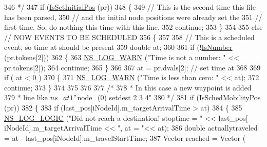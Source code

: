 \begin{DoxyCode}
346 \textcolor{comment}{           */}
347           \textcolor{keywordflow}{if} (\hyperlink{namespacens3_a9857c35eef6abfd7464f64108e1bfd29}{IsSetInitialPos} (pr))
348             \{
349               \textcolor{comment}{// This is the second time this file has been parsed,}
350               \textcolor{comment}{// and the initial node positions were already set the}
351               \textcolor{comment}{// first time.  So, do nothing this time with this line.}
352               \textcolor{keywordflow}{continue};
353             \}
354 
355           \textcolor{keywordflow}{else} \textcolor{comment}{// NOW EVENTS TO BE SCHEDULED}
356             \{
357 
358               \textcolor{comment}{// This is a scheduled event, so time at should be present}
359               \textcolor{keywordtype}{double} at;
360 
361               \textcolor{keywordflow}{if} (!\hyperlink{namespacens3_a1e7c472bb9c018ecd3509390ca7d09b3}{IsNumber} (pr.tokens[2]))
362                 \{
363                   \hyperlink{group__logging_gade7208b4009cdf0e25783cd26766f559}{NS\_LOG\_WARN} (\textcolor{stringliteral}{"Time is not a number: "} << pr.tokens[2]);
364                   \textcolor{keywordflow}{continue};
365                 \}
366 
367               at = pr.dvals[2]; \textcolor{comment}{// set time at}
368 
369               \textcolor{keywordflow}{if} ( at < 0 )
370                 \{
371                   \hyperlink{group__logging_gade7208b4009cdf0e25783cd26766f559}{NS\_LOG\_WARN} (\textcolor{stringliteral}{"Time is less than cero: "} << at);
372                   \textcolor{keywordflow}{continue};
373                 \}
374 
375 
376 
377               \textcolor{comment}{/*}
378 \textcolor{comment}{               * In this case a new waypoint is added}
379 \textcolor{comment}{               * line like $ns\_ at 1 "$node\_(0) setdest 2 3 4"}
380 \textcolor{comment}{               */}
381               \textcolor{keywordflow}{if} (\hyperlink{namespacens3_a1ccf8bc01e3dea4e713a6bddb9ef6e0e}{IsSchedMobilityPos} (pr))
382                 \{
383                   \textcolor{keywordflow}{if} (last\_pos[iNodeId].m\_targetArrivalTime > at)
384                     \{
385                       \hyperlink{group__logging_ga88acd260151caf2db9c0fc84997f45ce}{NS\_LOG\_LOGIC} (\textcolor{stringliteral}{"Did not reach a destination! stoptime = "} << last\_pos[
      iNodeId].m\_targetArrivalTime << \textcolor{stringliteral}{", at = "}<<  at);
386                       \textcolor{keywordtype}{double} actuallytraveled = at - last\_pos[iNodeId].m\_travelStartTime;
387                       Vector reached = Vector (

\end{DoxyCode}
